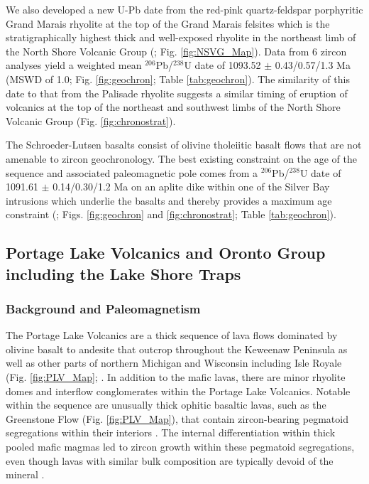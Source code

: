 \documentclass[11pt,letterpaper]{article}
\begin{document}
We also developed a new U-Pb date from the red-pink quartz-feldspar porphyritic Grand Marais rhyolite at the top of the Grand Marais felsites which is the stratigraphically highest thick and well-exposed rhyolite in the northeast limb of the North Shore Volcanic Group (\citealp{Boerboom2008a}; Fig. \ref{fig:NSVG_Map}). Data from 6 zircon analyses yield a weighted mean $^{206}$Pb/$^{238}$U date of 1093.52 $\pm$ 0.43/0.57/1.3 Ma (MSWD of 1.0; Fig. \ref{fig:geochron}; Table \ref{tab:geochron}). The similarity of this date to that from the Palisade rhyolite suggests a similar timing of eruption of volcanics at the top of the northeast and southwest limbs of the North Shore Volcanic Group (Fig. \ref{fig:chronostrat}).

The Schroeder-Lutsen basalts consist of olivine tholeiitic basalt flows that are not amenable to zircon geochronology. The best existing constraint on the age of the sequence and associated paleomagnetic pole comes from a  $^{206}$Pb/$^{238}$U date of 1091.61 $\pm$ 0.14/0.30/1.2 Ma on an aplite dike within one of the Silver Bay intrusions which underlie the basalts and thereby provides a maximum age constraint (\citealp{Fairchild2017a}; Figs. \ref{fig:geochron} and \ref{fig:chronostrat}; Table \ref{tab:geochron}).

\subsection{Portage Lake Volcanics and Oronto Group including the Lake Shore Traps}

\subsubsection{Background and Paleomagnetism}

The Portage Lake Volcanics are a thick sequence of lava flows dominated by olivine basalt to andesite that outcrop throughout the Keweenaw Peninsula as well as other parts of northern Michigan and Wisconsin including Isle Royale (Fig. \ref{fig:PLV_Map}; \citealp{Huber1973b,Cannon2001a}. In addition to the mafic lavas, there are minor rhyolite domes and interflow conglomerates within the Portage Lake Volcanics. Notable within the sequence are unusually thick ophitic basaltic lavas, such as the Greenstone Flow (Fig. \ref{fig:PLV_Map}), that contain zircon-bearing pegmatoid segregations within their interiors \citep{Cornwall1951a}. The internal differentiation within thick pooled mafic magmas led to zircon growth within these pegmatoid segregations, even though lavas with similar bulk composition are typically devoid of the mineral \citep{Davis1990a}.
\end{document}
